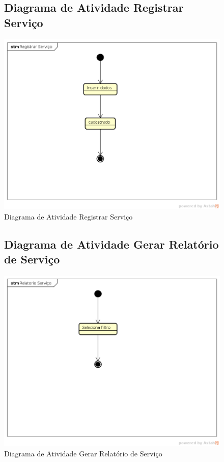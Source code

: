 \documentclass[
	12pt,				%
	openright,
	oneside,			%
	a4paper,			%
	chapter=TITLE,		%
	brazil				%
	]{abntex2}
\begin{document}
\begin{figure}[h!]
\subsection{Diagrama de Atividade Registrar Serviço}
	\caption{Diagrama de Atividade Registrar Serviço}
	\begin{center}
	    \includegraphics[scale=0.6]{Arquivos/DTE/Registrar_Servico}  
	\end{center}
\end{figure}



\begin{figure}[h!]
\subsection{Diagrama de Atividade Gerar Relatório de Serviço}
	\caption{Diagrama de Atividade Gerar Relatório de Serviço}
	\begin{center}
	    \includegraphics[scale=0.6]{Arquivos/DTE/Relatorio_Servico}  
	\end{center}
\end{figure}
\end{document}
